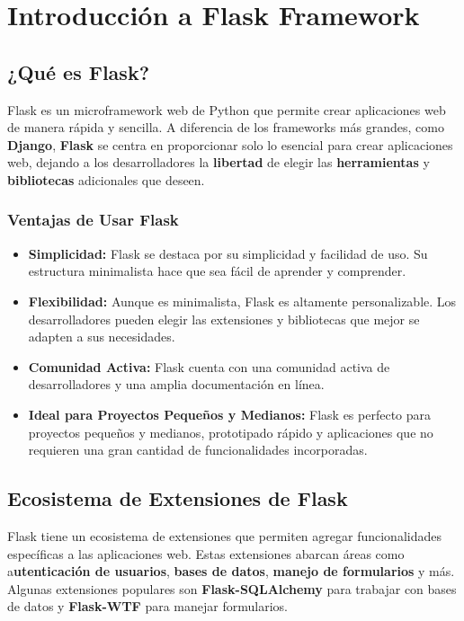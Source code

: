 \documentclass[
  a4paper,
  DIV=11,
  numbers=noendperiod,
  onepage,
  openany]{scrreprt}
\begin{document}
\chapter{Introducción a Flask
Framework}\label{introducciuxf3n-a-flask-framework}

\section{¿Qué es Flask?}\label{quuxe9-es-flask}

Flask es un microframework web de Python que permite crear aplicaciones
web de manera rápida y sencilla. A diferencia de los frameworks más
grandes, como \textbf{Django}, \textbf{Flask} se centra en proporcionar
solo lo esencial para crear aplicaciones web, dejando a los
desarrolladores la \textbf{libertad} de elegir las \textbf{herramientas}
y \textbf{bibliotecas} adicionales que deseen.

\subsection{Ventajas de Usar Flask}\label{ventajas-de-usar-flask}

\begin{itemize}
\item
  \textbf{Simplicidad:} Flask se destaca por su simplicidad y facilidad
  de uso. Su estructura minimalista hace que sea fácil de aprender y
  comprender.
\item
  \textbf{Flexibilidad:} Aunque es minimalista, Flask es altamente
  personalizable. Los desarrolladores pueden elegir las extensiones y
  bibliotecas que mejor se adapten a sus necesidades.
\item
  \textbf{Comunidad Activa:} Flask cuenta con una comunidad activa de
  desarrolladores y una amplia documentación en línea.
\item
  \textbf{Ideal para Proyectos Pequeños y Medianos:} Flask es perfecto
  para proyectos pequeños y medianos, prototipado rápido y aplicaciones
  que no requieren una gran cantidad de funcionalidades incorporadas.
\end{itemize}

\section{Ecosistema de Extensiones de
Flask}\label{ecosistema-de-extensiones-de-flask}

Flask tiene un ecosistema de extensiones que permiten agregar
funcionalidades específicas a las aplicaciones web. Estas extensiones
abarcan áreas como a\textbf{utenticación de usuarios}, \textbf{bases de
datos}, \textbf{manejo de formularios} y más. Algunas extensiones
populares son \textbf{Flask-SQLAlchemy} para trabajar con bases de datos
y \textbf{Flask-WTF} para manejar formularios.
\end{document}

